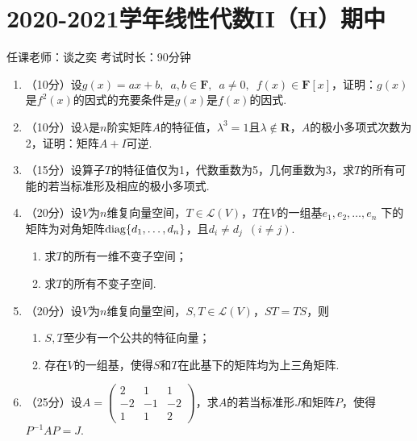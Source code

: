 \section{2020-2021学年线性代数II（H）期中}

\begin{center}
    任课老师：谈之奕\hspace{4em} 考试时长：90分钟
\end{center}

\begin{enumerate}
    \item （10分）设$g(x)=ax+b,\enspace a,b\in\mathbf{F},\enspace a\neq 0,\enspace f(x)\in \mathbf{F}[x]$，证明：$g(x)$是$f^2(x)$的因式的充要条件是$g(x)$是$f(x)$的因式.

    \item （10分）设$\lambda$是$n$阶实矩阵$A$的特征值，$\lambda^3=1$且$\lambda\notin\mathbf{R}$，$A$的极小多项式次数为2，证明：矩阵$A+I$可逆.

    \item （15分）设算子$T$的特征值仅为1，代数重数为5，几何重数为3，求$T$的所有可能的若当标准形及相应的极小多项式.

    \item （20分）设$V$为$n$维复向量空间，$T\in \mathcal{L}(V)$，$T$在$V$的一组基$e_1,e_2,\ldots,e_n$ 下的矩阵为对角矩阵$\operatorname{diag}\{d_1,\ldots,d_n\}$，且$d_i\neq d_j\enspace(i\neq j)$.
    \begin{enumerate}
        \item 求$T$的所有一维不变子空间；

        \item 求$T$的所有不变子空间.
    \end{enumerate}

    \item （20分）设$V$为$n$维复向量空间，$S,T\in \mathcal{L}(V)$，$ST=TS$，则
    \begin{enumerate}
        \item $S,T$至少有一个公共的特征向量；

        \item 存在$V$的一组基，使得$S$和$T$在此基下的矩阵均为上三角矩阵.
    \end{enumerate}

    \item （25分）设$A=\begin{pmatrix}
        2 & 1 & 1 \\ -2 & -1 & -2 \\ 1 & 1 & 2
    \end{pmatrix}$，求$A$的若当标准形$J$和矩阵$P$，使得$P^{-1}AP=J$.
\end{enumerate}

\clearpage
